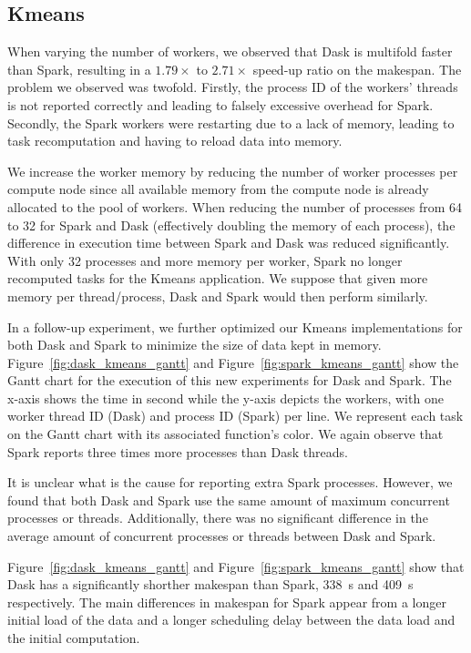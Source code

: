 \documentclass[AMA,STIX1COL]{WileyNJD-v2}
\newcommand{\HL}[1]{#1}
\begin{document}
\subsection{Kmeans}
\HL{
	When varying the number of workers, we observed that Dask is multifold faster
	than Spark, resulting in a $1.79\times$ to $2.71\times$ speed-up ratio on the makespan.
	The problem we observed was twofold.
	Firstly, the process ID of the workers' threads is not reported correctly and 
	leading to falsely excessive overhead for Spark.
	Secondly, the Spark workers were restarting due to a lack of memory, leading 
	to task recomputation and having to reload data into memory.
}
							
We increase the worker memory by reducing the number of worker processes per
compute node since all available memory from the compute node is already allocated to the pool of workers.
When reducing the number of processes from 64 to 32 for Spark and Dask 
(effectively doubling the memory of each process), the difference in execution time between Spark and Dask was reduced significantly.
With only 32 processes and more memory per worker, Spark no longer recomputed tasks for the Kmeans application.
We suppose that given more memory per thread/process, Dask and Spark would then perform similarly.
							
In a follow-up experiment, we further optimized our Kmeans implementations for both Dask and Spark to minimize the size of data kept in memory.
Figure~{\ref{fig:dask_kmeans_gantt}} and Figure~{\ref{fig:spark_kmeans_gantt}} show the Gantt chart for the execution
of this new experiments for Dask and Spark.
The x-axis shows the time in second while the y-axis depicts the workers, with 
one worker thread ID (Dask) and process ID (Spark) per line.
We represent each task on the Gantt chart with its associated function's color.
We again observe that Spark reports three times more processes than Dask threads.
\HL{
	It is unclear what is the cause for reporting extra Spark processes.
	However, we found that both Dask and Spark use the same 
	amount of maximum concurrent processes or threads.
	Additionally, there was no significant difference in the average amount of 
	concurrent processes or threads between Dask and Spark.
}
							
Figure~{\ref{fig:dask_kmeans_gantt}} and Figure~{\ref{fig:spark_kmeans_gantt}}
show that Dask has a significantly shorther makespan than Spark, {\SI{338}{\second}}
and {\SI{409}{\second}} respectively.
The main differences in makespan for Spark appear from a longer initial load of the data
and a longer scheduling delay between the data load and the initial computation.
							
\end{document}
